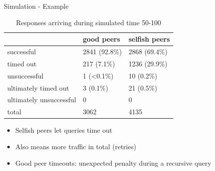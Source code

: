 \documentclass[presentation,english,usenames,dvipsnames]{beamer}
\begin{document}
\begin{frame}{Simulation - Example}
  \begin{table}
    \centering
    \begin{tabular}{|l|l|l|}
      \hline
      & good peers & selfish peers \\
      \hline
      successful & 2841 (92.8\%) & 2868 (69.4\%) \\
      \hline
      timed out & 217 (7.1\%) & 1236 (29.9\%) \\
      \hline
      unsuccessful & 1 (<0.1\%) & 10 (0.2\%) \\
      \hline
      ultimately timed out & 3 (0.1\%)  & 21 (0.5\%) \\
      \hline
      ultimately unsuccessful & 0 & 0 \\
      \hline
      total & 3062 & 4135 \\
      \hline
    \end{tabular}
    \caption*{Responses arriving during simulated time 50-100}
  \end{table}
  \begin{itemize}
    \item Selfish peers let queries time out
    \item Also means more traffic in total (retries)
    \item Good peer timeouts: unexpected penalty during a recursive query
  \end{itemize}
\end{frame}
\end{document}
